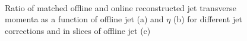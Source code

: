  \begin{figure}[hbtp]
    \centering
{}
\hfill
{} \\
\caption[Jet response as a function of jet \pt and $\eta$]{Ratio of matched offline and online reconstructed jet
transverse momenta as a function of offline jet \pt (a) and $\eta$ (b) for different jet corrections and in slices of
offline jet \pt (c)}
\label{fig:top_hlt_jet_response} 
\end{figure}

